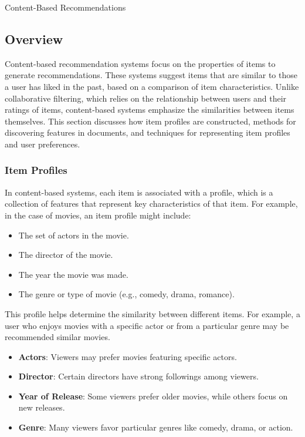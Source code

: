 \begin{notes}{Content-Based Recommendations}
    \subsection*{Overview}

    Content-based recommendation systems focus on the properties of items to generate recommendations. These systems suggest items that are similar to those a user has liked in the past, based on a comparison 
    of item characteristics. Unlike collaborative filtering, which relies on the relationship between users and their ratings of items, content-based systems emphasize the similarities between items themselves. 
    This section discusses how item profiles are constructed, methods for discovering features in documents, and techniques for representing item profiles and user preferences.
    
    \subsubsection*{Item Profiles}
    
    In content-based systems, each item is associated with a profile, which is a collection of features that represent key characteristics of that item. For example, in the case of movies, an item profile might include:
    \begin{itemize}
        \item The set of actors in the movie.
        \item The director of the movie.
        \item The year the movie was made.
        \item The genre or type of movie (e.g., comedy, drama, romance).
    \end{itemize}
    This profile helps determine the similarity between different items. For example, a user who enjoys movies with a specific actor or from a particular genre may be recommended similar movies.
    
    \begin{highlight}
        \begin{itemize}
            \item \textbf{Actors}: Viewers may prefer movies featuring specific actors.
            \item \textbf{Director}: Certain directors have strong followings among viewers.
            \item \textbf{Year of Release}: Some viewers prefer older movies, while others focus on new releases.
            \item \textbf{Genre}: Many viewers favor particular genres like comedy, drama, or action.
        \end{itemize}
    \end{highlight}
    

\end{notes}
